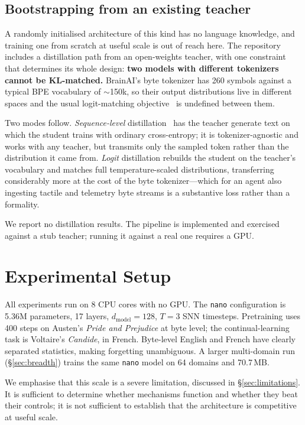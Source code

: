 \documentclass[10pt,twocolumn]{article}
\begin{document}
\subsection{Bootstrapping from an existing teacher}

A randomly initialised architecture of this kind has no language knowledge, and
training one from scratch at useful scale is out of reach here. The repository
includes a distillation path from an open-weights teacher, with one constraint
that determines its whole design: \textbf{two models with different tokenizers
cannot be KL-matched.} BrainAI's byte tokenizer has 260 symbols against a
typical BPE vocabulary of $\sim$150k, so their output distributions live in
different spaces and the usual logit-matching objective~\cite{hinton2015} is
undefined between them.

Two modes follow. \emph{Sequence-level} distillation~\cite{kim2016} has the
teacher generate text on which the student trains with ordinary cross-entropy;
it is tokenizer-agnostic and works with any teacher, but transmits only the
sampled token rather than the distribution it came from. \emph{Logit}
distillation rebuilds the student on the teacher's vocabulary and matches full
temperature-scaled distributions, transferring considerably more at the cost of
the byte tokenizer---which for an agent also ingesting tactile and telemetry
byte streams is a substantive loss rather than a formality.

We report no distillation results. The pipeline is implemented and exercised
against a stub teacher; running it against a real one requires a GPU.

\section{Experimental Setup}

All experiments run on 8 CPU cores with no GPU. The \texttt{nano} configuration
is 5.36M parameters, 17 layers, $d_{\text{model}}=128$, $T=3$ SNN timesteps.
Pretraining uses 400 steps on Austen's \emph{Pride and Prejudice} at byte level;
the continual-learning task is Voltaire's \emph{Candide}, in French. Byte-level
English and French have clearly separated statistics, making forgetting
unambiguous. A larger multi-domain run (\S\ref{sec:breadth}) trains the same
\texttt{nano} model on 64 domains and 70.7\,MB.

We emphasise that this scale is a severe limitation, discussed in
\S\ref{sec:limitations}. It is sufficient to determine whether mechanisms
function and whether they beat their controls; it is not sufficient to
establish that the architecture is competitive at useful scale.
\end{document}
